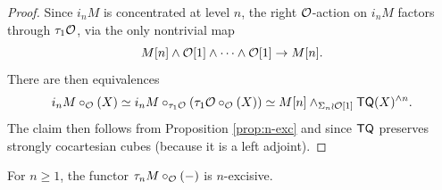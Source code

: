 \begin{proof}
  
Since $i_n M$ is concentrated at level $n$, the right $\mathcal{O}$-action on $i_n M$ factors through $\tau_1\mathcal{O}$, via the only nontrivial map \[ M[n] \wedge \mathcal{O}[1] \wedge \cdots \wedge \mathcal{O}[1]\to M[n].\] There are then equivalences \begin{equation} \label{D_n-F_M} 
    i_n M \circ_{\mathcal{O}} (X) \simeq i_n M\circ_{\tau_1\mathcal{O}} (\tau_1\mathcal{O}\circ_{\mathcal{O}} (X))\simeq  M[n] \wedge_{\Sigma_n \wr \mathcal{O}[1]} \mathsf{TQ}(X)^{\wedge n}.\end{equation}
The claim then follows from Proposition \ref{prop:n-exc} and since $\mathsf{TQ}$ preserves strongly cocartesian cubes (because it is a left adjoint).
\end{proof}

\begin{proposition}
    For $n\geq 1$, the functor $\tau_n M\circ_{\mathcal{O}} (-)$ is $n$-excisive. 
\end{proposition}


